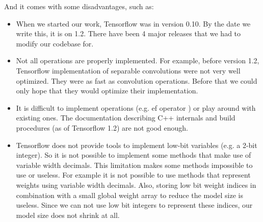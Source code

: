 And it comes with some disadvantages, such as:

\begin{itemize}
\item When we started our work, Tensorflow was in version 0.10. By the date we write this, it is on 1.2. There have been 4 major releases that we had to modify our codebase for.
\item Not all operations are properly implemented. For example, before version 1.2, Tensorflow implementation of separable convolutions were not very well optimized. They were as fast as convolution operations. Before that we could only hope that they would optimize their implementation.
\item It is difficult to implement operations (e.g. ef operator \cite{afrasiyabi2017energy}) or play around with existing ones. The documentation describing C++ internals and build procedures (as of Tensorflow 1.2) are not good enough. 
\item Tensorflow does not provide tools to implement low-bit variables (e.g. a 2-bit integer). So it is not possible to implement some methods that make use of variable width decimals. This limitation makes some methods impossible to use or useless. For example it is not possible to use methods that represent weights using variable width decimals. Also, storing low bit weight indices in combination with a small global weight array to reduce the model size is useless. Since we can not use low bit integers to represent these indices, our model size does not shrink at all.
\end{itemize}
